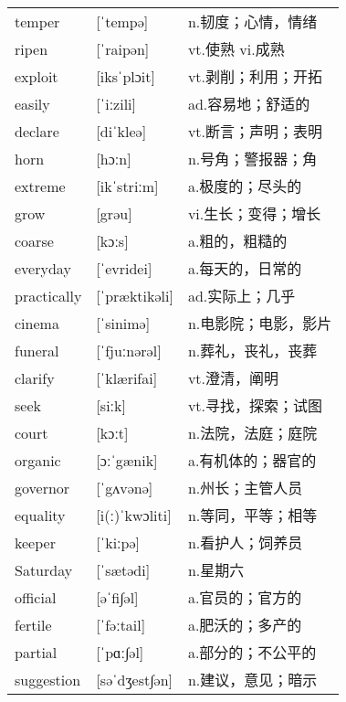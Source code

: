 \documentclass[a4paper]{article}
\begin{document}
\section{}
\begin{tabular}{l l l}

temper & [ˈtempə] & n.韧度；心情，情绪 \\
ripen & [ˈraipən] & vt.使熟 vi.成熟 \\
exploit & [iksˈplɔit] & vt.剥削；利用；开拓 \\
easily & [ˈiːzili] & ad.容易地；舒适的 \\
declare & [diˈkleə] & vt.断言；声明；表明 \\
horn & [hɔːn] & n.号角；警报器；角 \\
extreme & [ikˈstriːm] & a.极度的；尽头的 \\
grow & [grəu] & vi.生长；变得；增长 \\
coarse & [kɔːs] & a.粗的，粗糙的 \\
everyday & [ˈevridei] & a.每天的，日常的 \\
practically & [ˈpræktikəli] & ad.实际上；几乎 \\
cinema & [ˈsinimə] & n.电影院；电影，影片 \\
funeral & [ˈfjuːnərəl] & n.葬礼，丧礼，丧葬 \\
clarify & [ˈklærifai] & vt.澄清，阐明 \\
seek & [siːk] & vt.寻找，探索；试图 \\
court & [kɔːt] & n.法院，法庭；庭院 \\
organic & [ɔːˈgænik] & a.有机体的；器官的 \\
governor & [ˈgʌvənə] & n.州长；主管人员 \\
equality & [i(ː)ˈkwɔliti] & n.等同，平等；相等 \\
keeper & [ˈkiːpə] & n.看护人；饲养员 \\
Saturday & [ˈsætədi] & n.星期六 \\
official & [əˈfi∫əl] & a.官员的；官方的 \\
fertile & [ˈfəːtail] & a.肥沃的；多产的 \\
partial & [ˈpɑː∫əl] & a.部分的；不公平的 \\
suggestion & [səˈdʒest∫ən] & n.建议，意见；暗示 \\

\end{tabular}
\end{document}
